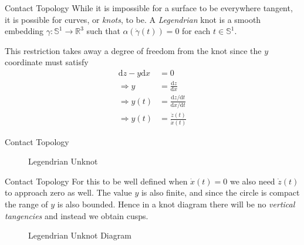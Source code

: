 \documentclass{beamer}
\begin{document}
    \begin{frame}{Contact Topology}
        While it is impossible for a surface to be everywhere tangent, it is
        possible for curves, or \textit{knots}, to be. A \textit{Legendrian}
        knot is a smooth embedding
        $\gamma:\mathbb{S}^{1}\rightarrow\mathbb{R}^{3}$ such that
        $\alpha(\dot{\gamma}(t))=0$ for each $t\in\mathbb{S}^{1}$.
        \par\hfill\par
        This restriction takes away a degree of freedom from the knot since
        the $y$ coordinate must satisfy
        \begin{align}
            \textrm{d}z-y\textrm{d}x&=0\\
            \Rightarrow
            y&=\frac{\textrm{d}z}{\textrm{d}x}\\
            \Rightarrow{y}(t)&=
            \frac{\textrm{d}z/\textrm{d}t}{\textrm{d}x/\textrm{d}t}\\
            \Rightarrow
            y(t)&=\frac{\dot{z}(t)}{\dot{x}(t)}
        \end{align}
    \end{frame}
    \begin{frame}{Contact Topology}
        \begin{figure}
            \centering
            \caption{Legendrian Unknot}
        \end{figure}
    \end{frame}
    \begin{frame}{Contact Topology}
        For this to be well defined when $\dot{x}(t)=0$ we also need
        $\dot{z}(t)$ to approach zero as well. The value $y$ is also finite,
        and since the circle is compact the range of $y$ is also bounded.
        Hence in a knot diagram there will be no
        \textit{vertical tangencies} and instead we obtain cusps.
        \begin{figure}
            \centering
            \caption{Legendrian Unknot Diagram}
        \end{figure}
    \end{frame}
\end{document}

